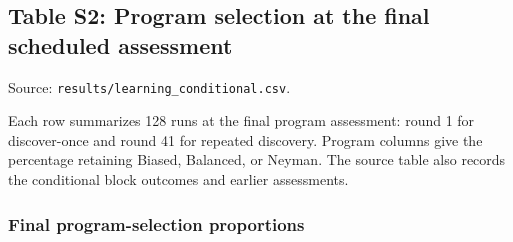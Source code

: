 \subsection*{Table S2: Program selection at the final scheduled assessment}
\label{supp:S2}
{\footnotesize Source: \texttt{results/learning\_conditional.csv}.}\par Each row summarizes 128 runs at the final program assessment: round 1 for discover-once and round 41 for repeated discovery. Program columns give the percentage retaining Biased, Balanced, or Neyman. The source table also records the conditional block outcomes and earlier assessments.

\subsubsection*{Final program-selection proportions}
\begingroup\footnotesize\setlength{\tabcolsep}{4pt}

